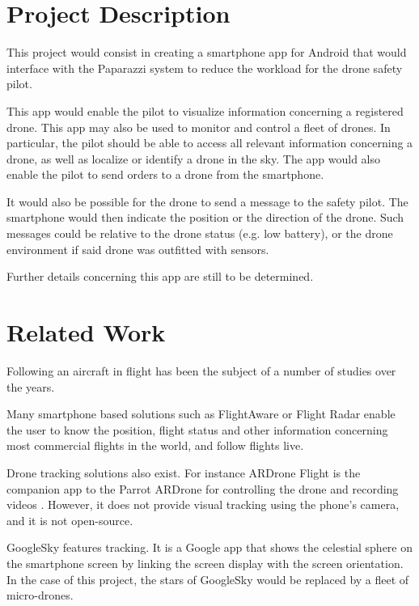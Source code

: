 \documentclass[10pt,letterpaper]{article}
\begin{document}
\section{Project Description}
This project would consist in creating a smartphone app for Android that would interface with the Paparazzi system to reduce the workload for the drone safety pilot. 

This app would enable the pilot to visualize information concerning a registered drone. This app may also be used to monitor and control a fleet of drones. In particular, the pilot should be able to access all relevant information concerning a drone, as well as localize or identify a drone in the sky. The app would also enable the pilot to send orders to a drone from the smartphone. 

It would also be possible for the drone to send a message to the safety pilot. The smartphone would then indicate the position or the direction of the drone. Such messages could be relative to the drone status (e.g. low battery), or the drone environment if said drone was outfitted with sensors. 

Further details concerning this app are still to be determined. 

\section{Related Work}
Following an aircraft in flight has been the subject of a number of studies over the years. 

Many smartphone based solutions such as FlightAware \cite{FlightAware} or Flight Radar \cite{FlightRadar24} enable the user to know the position, flight status and other information concerning most commercial flights in the world, and follow flights live. 

Drone tracking solutions also exist. For instance ARDrone Flight is the companion app to the Parrot ARDrone for controlling the drone and recording videos \cite{ARDroneFlight,ARDrone}. However, it does not provide visual tracking using the phone's camera, and it is not open-source. 

GoogleSky features tracking. It is a Google app that shows  the celestial sphere on the smartphone screen by linking the screen display with the screen orientation. In the case of this project, the stars of GoogleSky would be replaced by a fleet of micro-drones. 
\end{document}
